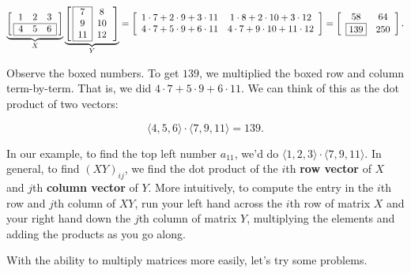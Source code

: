 \documentclass[../textbook.tex]{subfiles}
\begin{document}
\begin{center}
$$\underbrace{\left[\,\begin{array}{ccc}
1                      & 2 & 3                      \\ \hline
\multicolumn{1}{|l}{4} & 5 & \multicolumn{1}{l|}{6} \\ \hline
\end{array}\,\right]}_{X}\underbrace{\left[\,\begin{array}{|c|c}
\cline{1-1}
7  & 8  \\
9  & 10 \\
11 & 12 \\ \cline{1-1}
\end{array}\,\right]}_{Y}=\left[\begin{array}{cc}
1\cdot 7 + 2\cdot 9 + 3\cdot 11 & 1\cdot 8 + 2\cdot 10 + 3\cdot 12 \\
4\cdot 7 + 5\cdot 9 + 6\cdot 11 & 4\cdot 7 + 9\cdot 10 + 11\cdot 12 \\
\end{array}
\right]=\left[\begin{array}{cc}
58 & 64 \\
\boxed{139} & 250 \\
\end{array}\right].$$
\end{center}

\noindent Observe the boxed numbers. To get $139$, we multiplied the boxed row and column term-by-term. That is, we did $4\cdot 7 + 5\cdot 9 + 6\cdot 11$. We can think of this as the dot product of two vectors:

$$\langle 4, 5, 6\rangle \cdot \langle 7, 9, 11\rangle = 139.$$

\noindent In our example, to find the top left number $a_{11}$, we'd do $\langle 1,2,3\rangle \cdot \langle 7,9,11\rangle$. In general, to find $(XY)_{ij}$, we find the dot product of the $i$th \textbf{row vector} of $X$ and $j$th \textbf{column vector} of $Y$. More intuitively, to compute the entry in the $i$th row and $j$th column of $XY$, run your left hand across the $i$th row of matrix $X$ and your right hand down the $j$th column of matrix $Y$, multiplying the elements and adding the products as you go along.

With the ability to multiply matrices more easily, let's try some problems.
\end{document}
